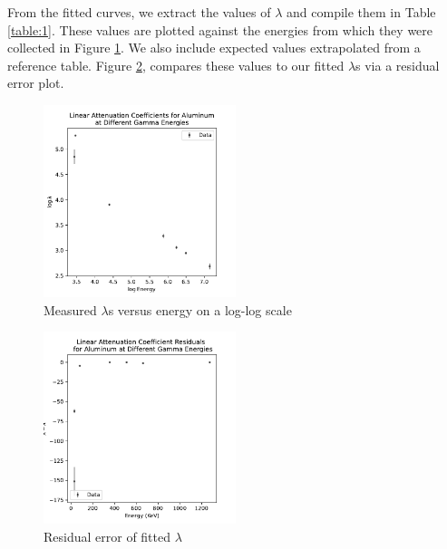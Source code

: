 \documentclass[12pt, letterpaper]{article}
\begin{document}
From the fitted curves, we extract the values of $\lambda$ and compile them in Table \ref{table:1}. These values are plotted against the energies from which they were collected in Figure \ref{fig:energy-lambdas}. We also include expected values extrapolated from a reference table. Figure \ref{fig:lambdas-residuals}, compares these values to our fitted $\lambda$s via a residual error plot. 

\begin{figure}[h]
    \centering
    \includegraphics[width=0.5\textwidth]{experiment1/figures/lamdba_vs_energy.pdf}
    \caption{Measured $\lambda$s versus energy on a log-log scale}
    \label{fig:energy-lambdas}
\end{figure}

\begin{figure}[h]
    \centering
    \includegraphics[width=0.5\textwidth]{experiment1/figures/lambda_residuals.pdf}
    \caption{Residual error of fitted $\lambda$}
    \label{fig:lambdas-residuals}
\end{figure}
\end{document}
